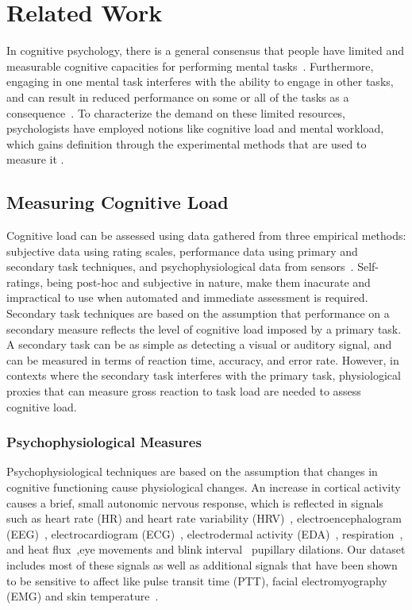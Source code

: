 \section{Related Work}
In cognitive psychology, there is a general consensus that people have limited and measurable cognitive capacities for performing mental tasks~\cite{miller1956}. Furthermore, engaging in one mental task interferes with the ability to engage in other tasks, and can result in reduced performance on some or all of the tasks as a consequence~\cite{kahneman1973}. To characterize the demand on these limited resources, psychologists have employed notions like cognitive load and mental workload, which gains definition through the experimental methods that are used to measure it \cite{klingner2010}. 

\subsection{Measuring Cognitive Load}
Cognitive load can be assessed using data gathered from three empirical methods: subjective data using rating scales, performance data using primary and secondary task techniques, and psychophysiological data from sensors~\cite{paas2003}. Self-ratings, being post-hoc and subjective in nature, make them inacurate and impractical to use when automated and immediate assessment is required. Secondary task techniques are based on the assumption that performance on a secondary measure reflects the level of cognitive load imposed by a primary task. A secondary task can be as simple as detecting a visual or auditory signal, and can be measured in terms of reaction time, accuracy, and error rate. However, in contexts where the secondary task interferes with the primary task, physiological proxies that can measure gross reaction to task load are needed to assess cognitive load.

\subsubsection{Psychophysiological Measures}
Psychophysiological techniques are based on the assumption that changes in cognitive functioning cause physiological changes. An increase in cortical activity causes a brief, small autonomic nervous response, which is reflected in signals such as heart rate (HR) and heart rate variability (HRV)~\cite{fredericks2005, mulder1992, wilson2002}, electroencephalogram (EEG)~\cite{ryu2005, wilson2002}, electrocardiogram (ECG)~\cite{ryu2005}, electrodermal activity (EDA)~\cite{ikehara2005, shi2007}, respiration~\cite{mulder1992}, and heat flux~\cite{haapalainen2010},eye movements and blink interval~\cite{beatty2000, ikehara2005, iqbal2005, wilson2002} pupillary dilations. Our dataset includes most of these signals as well as additional signals that have been shown to be sensitive to affect like pulse transit time (PTT), facial electromyography (EMG) and skin temperature~\cite{liu2008, or2007}. 


